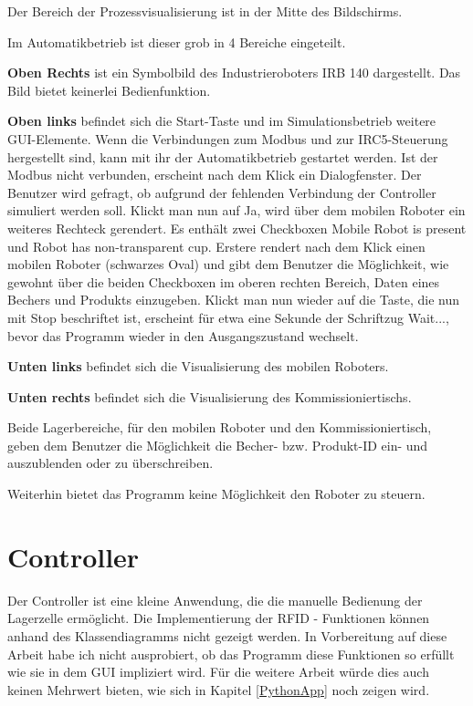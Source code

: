 Der Bereich der Prozessvisualisierung ist in der Mitte des Bildschirms.

Im Automatikbetrieb ist dieser grob in 4 Bereiche eingeteilt. 

\textbf{Oben Rechts} ist ein Symbolbild des Industrieroboters IRB 140 dargestellt. 
Das Bild bietet keinerlei Bedienfunktion.

\textbf{Oben links} befindet sich die Start-Taste und im Simulationsbetrieb weitere GUI-Elemente.
Wenn die Verbindungen zum Modbus und zur IRC5-Steuerung hergestellt sind, kann mit ihr der Automatikbetrieb gestartet werden.
Ist der Modbus nicht verbunden, erscheint nach dem Klick ein Dialogfenster.
Der Benutzer wird gefragt, ob aufgrund der fehlenden Verbindung der Controller simuliert werden soll.
Klickt man nun auf \glqq Ja\grqq{}, wird über dem mobilen Roboter ein weiteres Rechteck gerendert.
Es enthält zwei Checkboxen \glqq Mobile Robot is present\grqq{} und \glqq Robot has non-transparent cup\grqq{}.
Erstere rendert nach dem Klick einen mobilen Roboter (schwarzes Oval) und gibt dem Benutzer die Möglichkeit,
wie gewohnt über die beiden Checkboxen im oberen rechten Bereich, Daten eines Bechers und Produkts einzugeben.
Klickt man nun wieder auf die Taste, die nun mit \glqq Stop\grqq{} beschriftet ist, erscheint für etwa eine Sekunde
der Schriftzug \glqq Wait...\grqq{}, bevor das Programm wieder in den Ausgangszustand wechselt.

\textbf{Unten links} befindet sich die Visualisierung des mobilen Roboters. 

\textbf{Unten rechts} befindet sich die Visualisierung des Kommissioniertischs.

Beide Lagerbereiche, für den mobilen Roboter und den Kommissioniertisch,  
geben dem Benutzer die Möglichkeit die Becher- bzw. Produkt-ID ein- und auszublenden oder zu überschreiben.

Weiterhin bietet das Programm keine Möglichkeit den Roboter zu steuern.

\clearpage
\section {Controller}

Der Controller ist eine kleine Anwendung, die die manuelle Bedienung der Lagerzelle ermöglicht.
Die Implementierung der RFID - Funktionen können anhand des Klassendiagramms nicht gezeigt werden.
In Vorbereitung auf diese Arbeit habe ich nicht ausprobiert, ob das Programm diese Funktionen so erfüllt wie sie in dem
GUI impliziert wird.
Für die weitere Arbeit würde dies auch keinen Mehrwert bieten, wie sich in Kapitel \ref{PythonApp}
noch zeigen wird.

